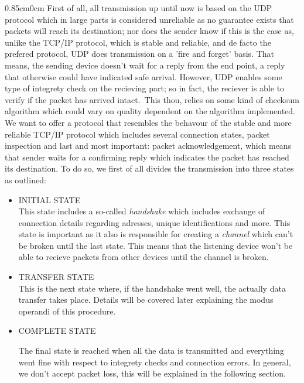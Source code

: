 \documentclass{article}
\newcommand{\tWidth}{0.85cm}
\begin{document}
	\begin{adjustwidth}{\tWidth}{0cm}
		First of all, all transmission up until now is based on the UDP protocol which in large parts is considered unreliable as no guarantee exists that packets will reach its destination; nor does the sender know if this is the case as, unlike the TCP/IP protocol, which is stable and reliable, and de facto the prefered protocol, UDP does transmission on a 'fire and forget' basis. That means, the sending device doesn't wait for a reply from the end point, a reply that otherwise could have indicated safe arrival. However, UDP enables some type of integrety check on the recieving part; so in fact, the reciever is able to verify if the packet has arrived intact.\ This thou, relies on some kind of checksum algorithm which could vary on quality dependent on the algorithm implemented.\\
		
		We want to offer a protocol that resembles the behavour of the stable and more reliable TCP/IP protocol which includes several connection states, packet inspection and last and most important: packet acknowledgement, which means that sender waits for a confirming reply which indicates the packet has reached its destination. To do so, we first of all divides the transmission into three states as outlined:
		
		\begin{itemize}
			\item INITIAL STATE\\
			
			This state includes a so-called \textit{handshake} which includes exchange of connection details regarding adresses, unique identifications and more. This state is important as it also is responsible for creating a \textit{channel} which can't be broken until the last state. This means that the listening device won't be able to recieve packets from other devices until the channel is broken.
			
			\item TRANSFER STATE\\
			This is the next state where, if the handshake went well, the actually data transfer takes place. Details will be covered later explaining the modus operandi of this procedure.
			
			\item COMPLETE STATE
			
			The final state is reached when all the data is transmitted and everything went fine with respect to integrety checks and connection errors. In general, we don't accept packet loss, this will be explained in the following section. 
		\end{itemize}
		

\end{adjustwidth}
\end{document}
